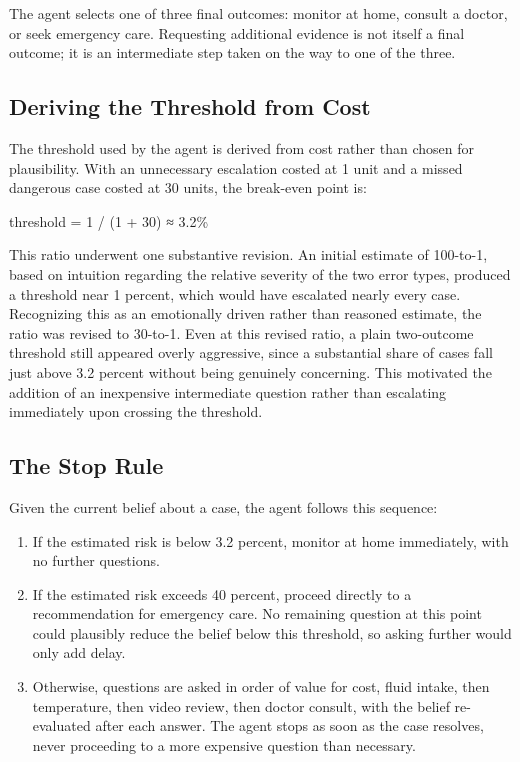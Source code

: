 \documentclass{article}
\begin{document}
The agent selects one of three final outcomes: monitor at home, consult
a doctor, or seek emergency care. Requesting additional evidence is not
itself a final outcome; it is an intermediate step taken on the way to
one of the three.

\hypertarget{deriving-the-threshold-from-cost}{%
\subsection{Deriving the Threshold from
Cost}\label{deriving-the-threshold-from-cost}}

The threshold used by the agent is derived from cost rather than chosen
for plausibility. With an unnecessary escalation costed at 1 unit and a
missed dangerous case costed at 30 units, the break-even point is:

threshold = 1 / (1 + 30) ≈ 3.2\%

This ratio underwent one substantive revision. An initial estimate of
100-to-1, based on intuition regarding the relative severity of the two
error types, produced a threshold near 1 percent, which would have
escalated nearly every case. Recognizing this as an emotionally driven
rather than reasoned estimate, the ratio was revised to 30-to-1. Even at
this revised ratio, a plain two-outcome threshold still appeared overly
aggressive, since a substantial share of cases fall just above 3.2
percent without being genuinely concerning. This motivated the addition
of an inexpensive intermediate question rather than escalating
immediately upon crossing the threshold.

\hypertarget{the-stop-rule}{%
\subsection{The Stop Rule}\label{the-stop-rule}}

Given the current belief about a case, the agent follows this sequence:

\begin{enumerate}
\def\labelenumi{\arabic{enumi}.}
\tightlist
\item
  If the estimated risk is below 3.2 percent, monitor at home
  immediately, with no further questions.
\item
  If the estimated risk exceeds 40 percent, proceed directly to a
  recommendation for emergency care. No remaining question at this point
  could plausibly reduce the belief below this threshold, so asking
  further would only add delay.
\item
  Otherwise, questions are asked in order of value for cost, fluid
  intake, then temperature, then video review, then doctor consult, with
  the belief re-evaluated after each answer. The agent stops as soon as
  the case resolves, never proceeding to a more expensive question than
  necessary.
\end{enumerate}
\end{document}
